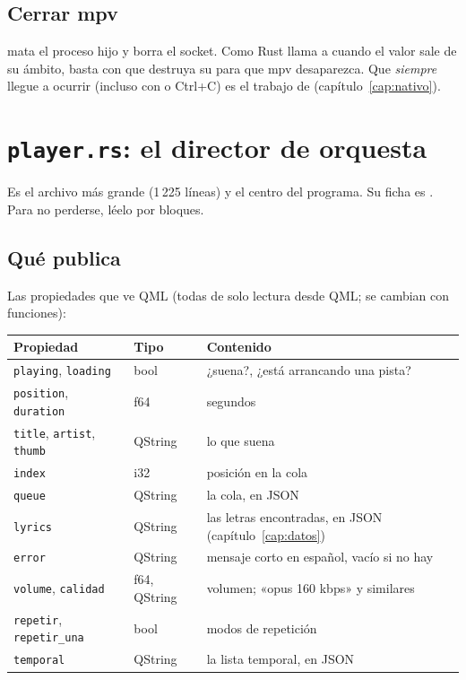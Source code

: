 \subsection{Cerrar mpv}

 mata el proceso hijo y borra el socket. Como Rust llama a 
cuando el valor sale de su ámbito, basta con que  destruya su 
para que mpv desaparezca. Que \emph{siempre} llegue a ocurrir (incluso con  o
Ctrl+C) es el trabajo de  (capítulo~\ref{cap:nativo}).

\section{\texttt{player.rs}: el director de orquesta}

Es el archivo más grande (1\,225 líneas) y el centro del programa. Su ficha es
. Para no perderse, léelo por bloques.

\subsection{Qué publica}

Las propiedades que ve QML (todas de solo lectura desde QML; se cambian con funciones):

\begin{center}
\small
\begin{tabularx}{\linewidth}{@{}llX@{}}
\toprule
Propiedad & Tipo & Contenido \\
\midrule
\texttt{playing}, \texttt{loading} & bool & ¿suena?, ¿está arrancando una pista? \\
\texttt{position}, \texttt{duration} & f64 & segundos \\
\texttt{title}, \texttt{artist}, \texttt{thumb} & QString & lo que suena \\
\texttt{index} & i32 & posición en la cola \\
\texttt{queue} & QString & la cola, en JSON \\
\texttt{lyrics} & QString & las letras encontradas, en JSON (capítulo~\ref{cap:datos}) \\
\texttt{error} & QString & mensaje corto en español, vacío si no hay \\
\texttt{volume}, \texttt{calidad} & f64, QString & volumen; «opus 160 kbps» y similares \\
\texttt{repetir}, \texttt{repetir\_una} & bool & modos de repetición \\
\texttt{temporal} & QString & la lista temporal, en JSON \\
\bottomrule
\end{tabularx}
\end{center}

